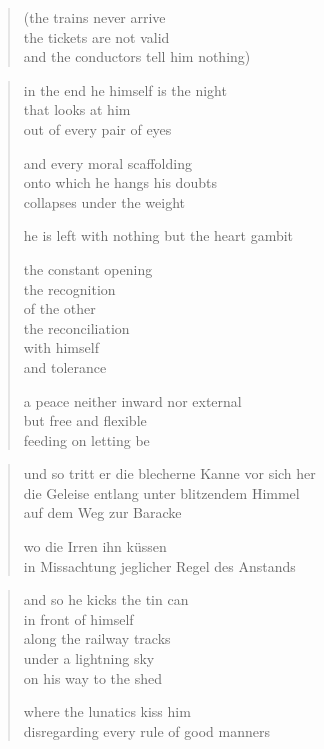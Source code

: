 {\clearpage

\begin{quote}
(the trains never arrive\\
the tickets are not valid\\
and the conductors tell him nothing)
\end{quote}

\begin{verse}
in the end he himself is the night\\
that looks at him\\
out of every pair of eyes

and every moral scaffolding\\
onto which he hangs his doubts\\
collapses under the weight

he is left with nothing but the heart gambit

the constant opening\\
the recognition\\
of the other\\
the reconciliation\\
with himself\\
and tolerance

a peace neither inward nor external\\
but free and flexible\\
feeding on letting be
\end{verse}

\clearpage

\begin{verse}
und so tritt er die blecherne Kanne vor sich her\\
die Geleise entlang unter blitzendem Himmel\\
auf dem Weg zur Baracke

wo die Irren ihn küssen\\
in Missachtung jeglicher Regel des Anstands
\end{verse}

\clearpage

\begin{verse}
and so he kicks the tin can\\
in front of himself\\
along the railway tracks\\
under a lightning sky\\
on his way to the shed

where the lunatics kiss him\\
disregarding every rule of good manners
\end{verse}

}
